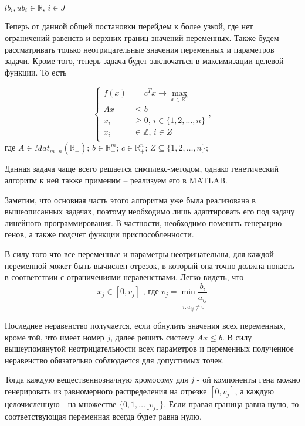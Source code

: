 \documentclass[../main.tex]{subfiles}
\begin{document}
 	 $lb_i, ub_i \in \mathbb{R} \text{, } i \in J$
 	
 	Теперь от данной общей постановки перейдем к более узкой, где нет ограничений-равенств и верхних границ значений переменных. Также будем рассматривать только неотрицательные значения переменных и параметров задачи. Кроме того, теперь задача будет заключаться в максимизации целевой функции. То есть
 	
 	\[\left\{\begin{aligned}
 		f(x) &= c^T x \rightarrow \underset{x \in \mathbb{R}^n}{\max} \\ 
 		Ax &\leqslant b \\
		x_i &\geqslant 0  \text{, } i \in  \{1, 2, \dots, n\} \\
 		x_i &\in \mathbb{Z}  \text{, }  i \in Z\\
 	\end{aligned}\right.,\]
 	где $A \in Mat_{m \text{ } n}(\mathbb{R}_+)$; $b \in \mathbb{R}_+^m$; $c \in \mathbb{R}_+^n$; $Z \subseteq \{1, 2, \dots, n\}$;
 	
 	Данная задача чаще всего решается симплекс-методом, однако генетический алгоритм к ней также применим -- реализуем его в MATLAB.
 	
 	Заметим, что основная часть этого алгоритма уже была реализована в вышеописанных задачах, поэтому необходимо лишь адаптировать его под задачу линейного программирования. В частности, необходимо поменять генерацию генов, а также подсчет функции приспособленности.
 	
 	В силу того что все переменные и параметры неотрицательны, для каждой переменной может быть вычислен отрезок, в который она точно должна попасть в соответствии с ограничениями-неравенствами. Легко видеть, что
 	 \[x_j \in [0, v_j] \text{ , где } v_j = \underset{i: a_{ij} \neq 0}{\min{\frac{b_i}{a_{ij}}}} \]
 	 
 	 Последнее неравенство получается, если обнулить значения всех переменных, кроме той, что имеет номер $j$, далее решить систему $Ax \leqslant b$. В силу вышеупомянутой неотрицательности всех параметров и переменных полученное неравенство обязательно соблюдается для допустимых точек.
 	  
 	 Тогда каждую вещественнозначную хромосому для $j$ - ой компоненты гена можно генерировать из равномерного распределения на отрезке $[0, v_j]$, а каждую целочисленную - на множестве $\{0, 1, \dots \lfloor v_j \rfloor \}$. Если правая граница равна нулю, то соответствующая переменная всегда будет равна нулю.
 	 
\end{document}
